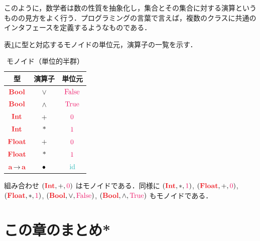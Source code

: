\documentclass[a5paper,twoside,fleqn,draft]{jsbook}
\begin{document}
このように，数学者は数の性質を抽象化し，集合とその集合に対する演算というものの見方をよく行う．プログラミングの言葉で言えば，複数のクラスに共通のインタフェースを定義するようなものである．

表\ref{tab:monoids}に型と対応するモノイドの単位元，演算子の一覧を示す．

\begin{table}
\caption{モノイド（単位的半群）}
\label{tab:monoids}
\begin{center}
\begin{tabular}{||c||c|c||}
\hline 型&演算子&単位元\\\hline\hline
$\hBool$ &$\vee$&$\hFalse$\\\hline
$\hBool$ &$\wedge$ &$\hTrue$\\\hline\hline
$\hInt$ &$+$ &$\hConstant{0}$\\\hline
$\hInt$ &$*$ &$\hConstant{1}$\\\hline\hline
$\hFloat$ &$+$ &$\hConstant{0}$\\\hline
$\hFloat$ &$*$ &$\hConstant{1}$\\\hline\hline
$\hTypeName{a}\hFunctionArrow\hTypeName{a}$ &$\operatorname{\bullet}$ &$\hId$\\\hline
\end{tabular}
\end{center}
\end{table}

組み合わせ $(\hInt,+,\hConstant{0})$ はモノイドである．同様に $(\hInt,*,\hConstant{1})$, $(\hFloat,+,\hConstant{0})$, $(\hFloat,*,\hConstant{1})$, $(\hBool,\hLogicalOr,\hFalse)$, $(\hBool,\hLogicalAnd,\hTrue)$ もモノイドである．


\section{この章のまとめ*}
\end{document}
